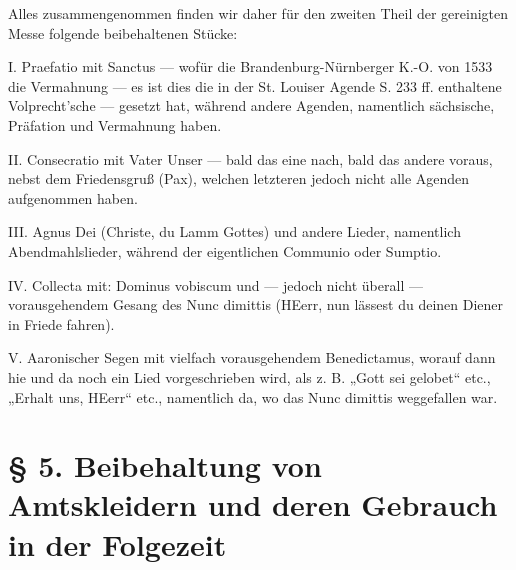 Alles zusammengenommen finden wir daher für den zweiten Theil der gereinigten Messe folgende beibehaltenen Stücke:

I. Praefatio mit Sanctus — wofür die Brandenburg-Nürnberger K.-O. von 1533 die Vermahnung — es ist dies die in der St. Louiser Agende S. 233 ff. enthaltene Volprecht’sche — gesetzt hat, während andere Agenden, namentlich sächsische, Präfation und Vermahnung haben.

II. Consecratio mit Vater Unser — bald das eine nach, bald das andere voraus, nebst dem Friedensgruß (Pax), welchen letzteren jedoch nicht alle Agenden aufgenommen haben.

III. Agnus Dei (Christe, du Lamm Gottes) und andere Lieder, namentlich Abendmahlslieder, während der eigentlichen Communio oder Sumptio.

IV. Collecta mit: Dominus vobiscum und — jedoch nicht überall — vorausgehendem Gesang des Nunc dimittis (HEerr, nun lässest du deinen Diener in Friede fahren).

V. Aaronischer Segen mit vielfach vorausgehendem Benedictamus, worauf dann hie und da noch ein Lied vorgeschrieben wird, als z. B. „Gott sei gelobet“ etc., „Erhalt uns, HEerr“ etc., namentlich da, wo das Nunc dimittis weggefallen war.

\chapter[§ 5. Beibehaltung von Amtskleidern]{§ 5. Beibehaltung von Amtskleidern und deren Gebrauch in der Folgezeit}


